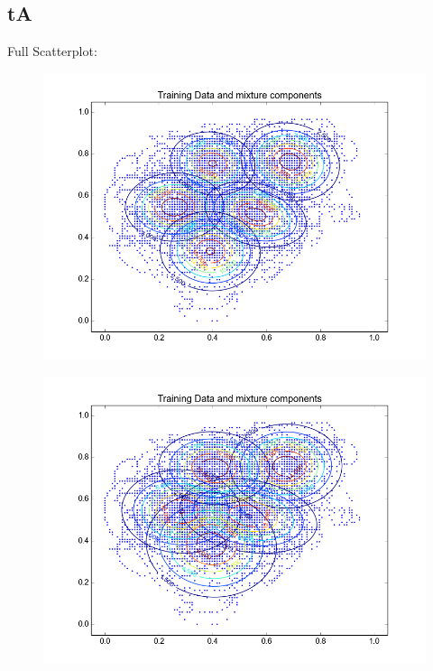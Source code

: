 \documentclass[11pt,a4paper]{article}
\begin{document}
\subsection{tA}
Full Scatterplot: \\
\begin{minipage}[b]{0.25\textwidth}
\begin{figure}[H]
  \centering
  \includegraphics[width=.8\linewidth]{Figures/contours_tA.test0.png}
  \label{fig:sfig1}
\end{figure}%
\end{minipage}
\begin{minipage}[b]{0.25\textwidth}
\begin{figure}[H]
  \centering
  \includegraphics[width=.8\linewidth]{Figures/contours_tA.test5.png}

  \label{fig:sfig1}
\end{figure}%
\end{minipage}
\end{document}
